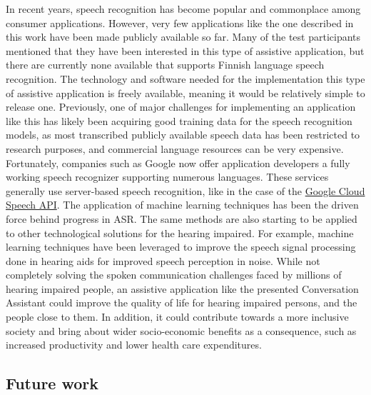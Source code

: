 \documentclass[english, 12pt, a4paper, pdftex, elec, utf8]{aaltothesis}
\begin{document}
In recent years, speech recognition has become popular and commonplace among consumer applications. However, very few applications like the one described in this work have been made publicly available so far. Many of the test participants mentioned that they have been interested in this type of assistive application, but there are currently none available that supports Finnish language speech recognition. The technology and software needed for the implementation this type of assistive application is freely available, meaning it would be relatively simple to release one. Previously, one of major challenges for implementing an application like this has likely been acquiring good training data for the speech recognition models, as most transcribed publicly available speech data has been restricted to research purposes, and commercial language resources can be very expensive. Fortunately, companies such as Google now offer application developers a fully working speech recognizer supporting numerous languages. These services generally use server-based speech recognition, like in the case of the \href{https://cloud.google.com/speech/}{Google Cloud Speech API}. The application of machine learning techniques has been the driven force behind progress in ASR. The same methods are also starting to be applied to other technological solutions for the hearing impaired. For example, machine learning techniques have been leveraged to improve the speech signal processing done in hearing aids \cite{goehring2016speech} for improved speech perception in noise. While not completely solving the spoken communication challenges faced by millions of hearing impaired people, an assistive application like the presented Conversation Assistant could improve the quality of life for hearing impaired persons, and the people close to them. In addition, it could contribute towards a more inclusive society and bring about wider socio-economic benefits as a consequence, such as increased productivity and lower health care expenditures.

\subsection{Future work}
\end{document}

